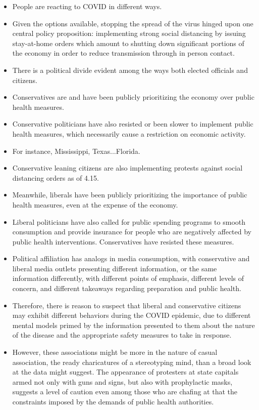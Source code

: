 \documentclass{article}
\begin{document}
\begin{itemize}
	\item People are reacting to COVID in different ways.
	\item Given the options available, stopping the spread of the virus hinged upon one central policy proposition: implementing strong social distancing by issuing stay-at-home orders which amount to shutting down significant portions of the economy in order to reduce transmission through in person contact. 
	\item There is a political divide evident among the ways both elected officials and citizens. 
	\item Conservatives are and have been publicly prioritizing the economy over public health measures.
	\item Conservative politicians have also resisted or been slower to implement public health measures, which necessarily cause a restriction on economic activity.
	\item For instance, Mississippi, Texas...Florida. 
	\item Conservative leaning citizens are also implementing protests against social distancing orders as of 4.15.
	\item Meanwhile, liberals have been publicly prioritizing the importance of public health measures, even at the expense of the economy. 
	\item Liberal politicians have also called for public spending programs to smooth consumption and provide insurance for people who are negatively affected by public health interventions. Conservatives have resisted these measures. 
	\item Political affiliation has analogs in media consumption, with conservative and liberal media outlets presenting different information, or the same information differently, with different points of emphasis, different levels of concern, and different takeaways regarding preparation and public health. 
	\item Therefore, there is reason to suspect that liberal and conservative citizens may exhibit different behaviors during the COVID epidemic, due to different mental models primed by the information presented to them about the nature of the disease and the appropriate safety measures to take in response. 
	\item However, these associations might be more in the nature of casual association, the ready charicatures of a stereotyping mind, than a broad look at the data might suggest. The appearance of protesters at state capitals armed not only with guns and signs, but also with prophylactic masks, suggests a level of caution even among those who are chafing at that the constraints imposed by the demands of public health authorities. 

\end{itemize}
\end{document}
